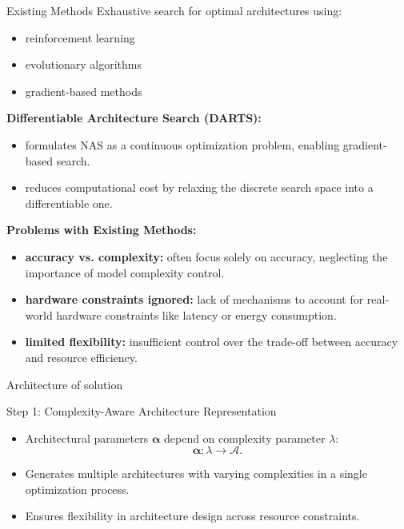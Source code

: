 \documentclass{beamer}
\begin{document}
\begin{frame}{Existing Methods}
Exhaustive search for optimal architectures using: 
\begin{itemize}
        \item reinforcement learning
        \item evolutionary algorithms
        \item gradient-based methods
\end{itemize}

\textbf{Differentiable Architecture Search (DARTS):}
\begin{itemize}

        \item formulates NAS as a continuous optimization problem, enabling gradient-based search.
        \item reduces computational cost by relaxing the discrete search space into a differentiable one.

\end{itemize}

\textbf{Problems with Existing Methods:}
\begin{itemize}

        \item \textbf{accuracy vs. complexity:} often focus solely on accuracy, neglecting the importance of model complexity control.
        \item \textbf{hardware constraints ignored:} lack of mechanisms to account for real-world hardware constraints like latency or energy consumption.
        \item \textbf{limited flexibility:} insufficient control over the trade-off between accuracy and resource efficiency.

\end{itemize}
\end{frame}




\begin{frame}{Architecture of solution}
\end{frame}


\begin{frame}{Step 1: Complexity-Aware Architecture Representation}
\begin{itemize}
    \item Architectural parameters \(\boldsymbol{\alpha}\) depend on complexity parameter \(\lambda\):
    \[
    \boldsymbol{\alpha}: \lambda \to \mathcal{A}.
    \]
    \item Generates multiple architectures with varying complexities in a single optimization process.
    \item Ensures flexibility in architecture design across resource constraints.
\end{itemize}
\end{frame}
\end{document}
